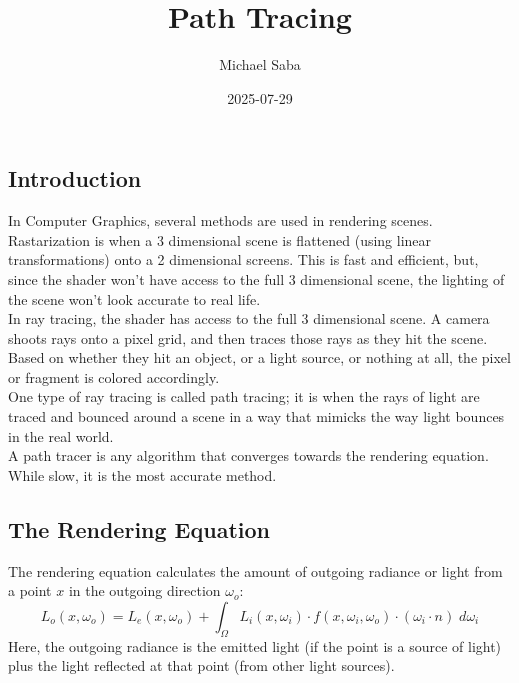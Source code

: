 \documentclass[12pt]{article}
\title{%
    \Huge Path Tracing
}
\date{2025-07-29}
\author{Michael Saba}
\begin{document}
\maketitle
\newpage
\setlength{\parindent}{0pt}

\newpage

\subsection*{Introduction}

In Computer Graphics, several methods are used
in rendering scenes. \\

Rastarization is when a 3 dimensional scene is flattened
(using linear transformations) onto a 2 dimensional
screens. This is fast and efficient, but, since
the shader won't have access to the full 3 dimensional
scene, the lighting of the scene won't look accurate
to real life. \\

In ray tracing, the shader has access to the full 3
dimensional scene. A camera shoots rays onto a pixel
grid, and then traces those rays as they hit the scene. \\
Based on whether they hit an object, or a light source,
or nothing at all, the pixel or fragment is colored 
accordingly. \\

One type of ray tracing is called path tracing; it is
when the rays of light are traced and bounced around
a scene in a way that mimicks the way light bounces
in the real world. \\ 
A path tracer is any algorithm that converges towards
the rendering equation. While slow, it is the most accurate
method. \\

\newpage


\subsection*{The Rendering Equation}

The rendering equation calculates the amount of
outgoing radiance or light from a point $x$
in the outgoing direction $\omega_o$:
\[ L_{o}(x, \omega_o)
= L_{e}(x, \omega_o)
+ \int_\Omega L_{i}(x, \omega_i) \cdot
f(x, \omega_i, \omega_o) \cdot
(\omega_i \cdot n) \; d\omega_i \]
Here, the outgoing radiance is the emitted light
(if the point is a source of light)
plus the light reflected at that point (from other
light sources). \\
\end{document}
